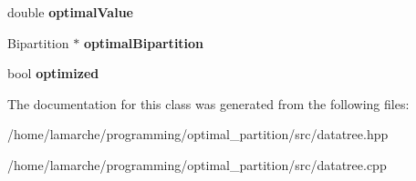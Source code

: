 \begin{DoxyCompactItemize}
\item 
\hypertarget{classDatatree_ab05119987fb8d744edd73177a8afd4dc}{double {\bfseries optimal\-Value}}\label{classDatatree_ab05119987fb8d744edd73177a8afd4dc}

\item 
\hypertarget{classDatatree_af77422049ff1cd38f8bff3258df2f6f2}{Bipartition $\ast$ {\bfseries optimal\-Bipartition}}\label{classDatatree_af77422049ff1cd38f8bff3258df2f6f2}

\item 
\hypertarget{classDatatree_a6255f63e818a66b3b0e15c395bae06fb}{bool {\bfseries optimized}}\label{classDatatree_a6255f63e818a66b3b0e15c395bae06fb}

\end{DoxyCompactItemize}


The documentation for this class was generated from the following files\-:\begin{DoxyCompactItemize}
\item 
/home/lamarche/programming/optimal\-\_\-partition/src/datatree.\-hpp\item 
/home/lamarche/programming/optimal\-\_\-partition/src/datatree.\-cpp\end{DoxyCompactItemize}
